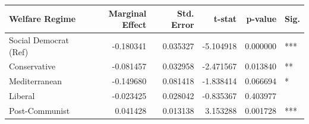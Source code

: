 \begin{tabular}{lrrrrl}
\toprule
Welfare Regime & Marginal Effect & Std. Error & t-stat & p-value & Sig. \\
\midrule
Social Democrat (Ref) & -0.180341 & 0.035327 & -5.104918 & 0.000000 & *** \\
Conservative & -0.081457 & 0.032958 & -2.471567 & 0.013840 & ** \\
Mediterranean & -0.149680 & 0.081418 & -1.838414 & 0.066694 & * \\
Liberal & -0.023425 & 0.028042 & -0.835367 & 0.403977 &  \\
Post-Communist & 0.041428 & 0.013138 & 3.153288 & 0.001728 & *** \\
\bottomrule
\end{tabular}
